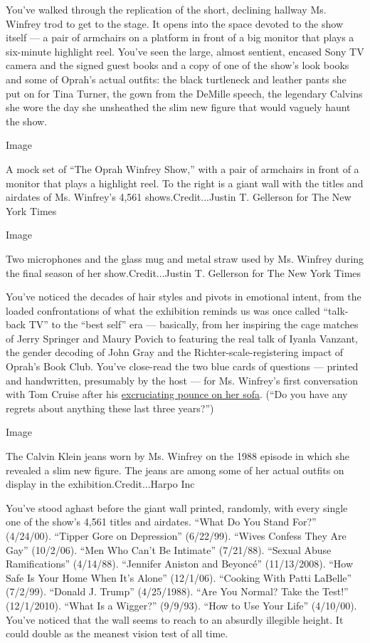 You've walked through the replication of the short, declining hallway
Ms. Winfrey trod to get to the stage. It opens into the space devoted to
the show itself --- a pair of armchairs on a platform in front of a big
monitor that plays a six-minute highlight reel. You've seen the large,
almost sentient, encased Sony TV camera and the signed guest books and a
copy of one of the show's look books and some of Oprah's actual outfits:
the black turtleneck and leather pants she put on for Tina Turner, the
gown from the DeMille speech, the legendary Calvins she wore the day she
unsheathed the slim new figure that would vaguely haunt the show.

Image

A mock set of ``The Oprah Winfrey Show,'' with a pair of armchairs in
front of a monitor that plays a highlight reel. To the right is a giant
wall with the titles and airdates of Ms. Winfrey's 4,561
shows.Credit...Justin T. Gellerson for The New York Times

Image

Two microphones and the glass mug and metal straw used by Ms. Winfrey
during the final season of her show.Credit...Justin T. Gellerson for The
New York Times

You've noticed the decades of hair styles and pivots in emotional
intent, from the loaded confrontations of what the exhibition reminds us
was once called ``talk-back TV'' to the ``best self'' era --- basically,
from her inspiring the cage matches of Jerry Springer and Maury Povich
to featuring the real talk of Iyanla Vanzant, the gender decoding of
John Gray and the Richter-scale-registering impact of Oprah's Book Club.
You've close-read the two blue cards of questions --- printed and
handwritten, presumably by the host --- for Ms. Winfrey's first
conversation with Tom Cruise after his
\href{https://www.youtube.com/watch?v=qQgXEkL3NV4}{excruciating pounce
on her sofa}. (``Do you have any regrets about anything these last three
years?'')

Image

The Calvin Klein jeans worn by Ms. Winfrey on the 1988 episode in which
she revealed a slim new figure. The jeans are among some of her actual
outfits on display in the exhibition.Credit...Harpo Inc

You've stood aghast before the giant wall printed, randomly, with every
single one of the show's 4,561 titles and airdates. ``What Do You Stand
For?'' (4/24/00). ``Tipper Gore on Depression'' (6/22/99). ``Wives
Confess They Are Gay'' (10/2/06). ``Men Who Can't Be Intimate''
(7/21/88). ``Sexual Abuse Ramifications'' (4/14/88). ``Jennifer Aniston
and Beyoncé'' (11/13/2008). ``How Safe Is Your Home When It's Alone''
(12/1/06). ``Cooking With Patti LaBelle'' (7/2/99). ``Donald J. Trump''
(4/25/1988). ``Are You Normal? Take the Test!'' (12/1/2010). ``What Is a
Wigger?'' (9/9/93). ``How to Use Your Life'' (4/10/00). You've noticed
that the wall seems to reach to an absurdly illegible height. It could
double as the meanest vision test of all time.

